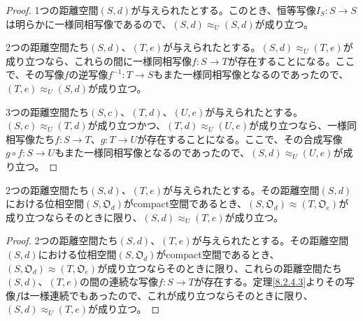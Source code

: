 \documentclass[dvipdfmx]{jsarticle}
\begin{document}
\begin{proof}
1つの距離空間$(S,d)$が与えられたとする。このとき、恒等写像$I_{S}:S \rightarrow S$は明らかに一様同相写像であるので、$(S,d) \approx_{U}(S,d)$が成り立つ。\par
2つの距離空間たち$(S,d)$、$(T,e)$が与えられたとする。$(S,d) \approx_{U}(T,e)$が成り立つなら、これらの間に一様同相写像$f:S \rightarrow T$が存在することになる。ここで、その写像$f$の逆写像$f^{- 1}:T \rightarrow S$もまた一様同相写像となるのであったので、$(T,e) \approx_{U}(S,d)$が成り立つ。\par
3つの距離空間たち$(S,c)$、$(T,d)$、$(U,e)$が与えられたとする。$(S,c) \approx_{U}(T,d)$が成り立つかつ、$(T,d) \approx_{U}(U,e)$が成り立つなら、一様同相写像たち$f:S \rightarrow T$、$g:T \rightarrow U$が存在することになる。ここで、その合成写像$g \circ f:S \rightarrow U$もまた一様同相写像となるのであったので、$(S,d) \approx_{U}(U,e)$が成り立つ。
\end{proof}
\begin{thm}\label{8.2.4.6}
2つの距離空間たち$(S,d)$\emph{、}$(T,e)$が与えられたとする。その距離空間$(S,d)$における位相空間$\left( S,\mathfrak{O}_{d} \right)$がcompact空間であるとき、$\left( S,\mathfrak{O}_{d} \right) \approx \left( T,\mathfrak{O}_{e} \right)$が成り立つならそのときに限り、$(S,d) \approx_{U}(T,e)$が成り立つ。
\end{thm}
\begin{proof}
2つの距離空間たち$(S,d)$、$(T,e)$が与えられたとする。その距離空間$(S,d)$における位相空間$\left( S,\mathfrak{O}_{d} \right)$がcompact空間であるとき、$\left( S,\mathfrak{O}_{d} \right) \approx \left( T,\mathfrak{O}_{e} \right)$が成り立つならそのときに限り、これらの距離空間たち$(S,d)$、$(T,e)$の間の連続な写像$f:S \rightarrow T$が存在する。定理\ref{8.2.4.3}よりその写像$f$は一様連続でもあったので、これが成り立つならそのときに限り、$(S,d) \approx_{U}(T,e)$が成り立つ。
\end{proof}
\end{document}
